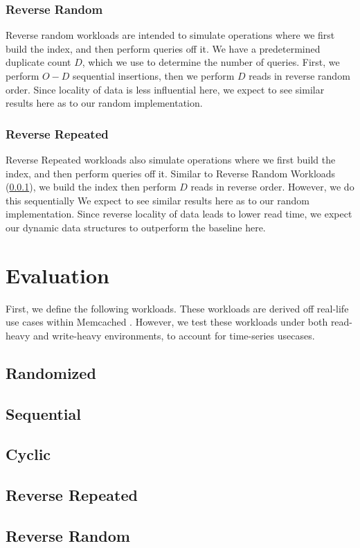 \documentclass[sigconf]{acmart}
\begin{document}
\subsubsection{Reverse Random}
\label{reverse_random}
Reverse random workloads are intended to simulate operations where we first build the index, and then perform queries off it. We have a predetermined duplicate count $D$, which we use to determine the number of queries. First, we perform $O-D$ sequential insertions, then we perform $D$ reads in reverse random order. Since locality of data is less influential here, we expect to see similar results here as to our random implementation.

\subsubsection{Reverse Repeated}
Reverse Repeated workloads also simulate operations where we first build the index, and then perform queries off it. Similar to Reverse Random Workloads (\ref{reverse_random}), we build the index then perform $D$ reads in reverse order. However, we do this sequentially We expect to see similar results here as to our random implementation. Since reverse locality of data leads to lower read time, we expect our dynamic data structures to outperform the baseline here.

\section{Evaluation}
First, we define the following workloads. These workloads are derived off real-life use cases within Memcached \cite{}. However, we test these workloads under both read-heavy and write-heavy environments, to account for time-series usecases. 

\subsection{Randomized}
\subsection{Sequential}
\subsection{Cyclic}
\subsection{Reverse Repeated}
\subsection{Reverse Random}
\end{document}
